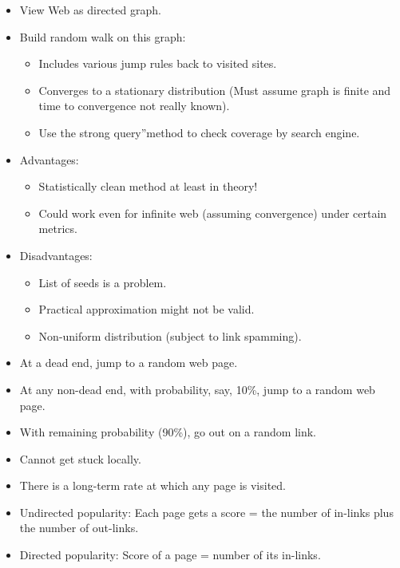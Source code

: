 \begin{breakbox}
\begin{itemize}
	\item View Web as directed graph.
	\item Build random walk on this graph:
		\begin{itemize}
			\item Includes various jump rules back to visited sites.
			\item Converges to a stationary distribution (Must assume graph is finite and time to convergence not really known).
			\item Use the strong query”method to check coverage by search engine.
		\end{itemize}
	\item Advantages:
		\begin{itemize}
			\item Statistically clean method at least in theory!
			\item Could work even for infinite web (assuming convergence) under certain metrics.
		\end{itemize}
	\item Disadvantages:
		\begin{itemize}
			\item List of seeds is a problem.
			\item Practical approximation might not be valid.
			\item Non-uniform distribution (subject to link spamming).
		\end{itemize}
\end{itemize}
\end{breakbox}

\begin{breakbox}
\begin{itemize}
	\item At a dead end, jump to a random web page.
	\item At any non-dead end, with probability, say, 10\%, jump to a random web page.
	\item With remaining probability (90\%), go out on a random link.
	\item Cannot get stuck locally.
	\item There is a long-term rate at which any page is visited.
\end{itemize}
\end{breakbox}

\begin{breakbox}
\begin{itemize}
	\item Undirected popularity: Each page gets a score = the number of in-links plus the number of out-links.
	\item Directed popularity: Score of a page = number of its in-links.
\end{itemize}
\end{breakbox}

